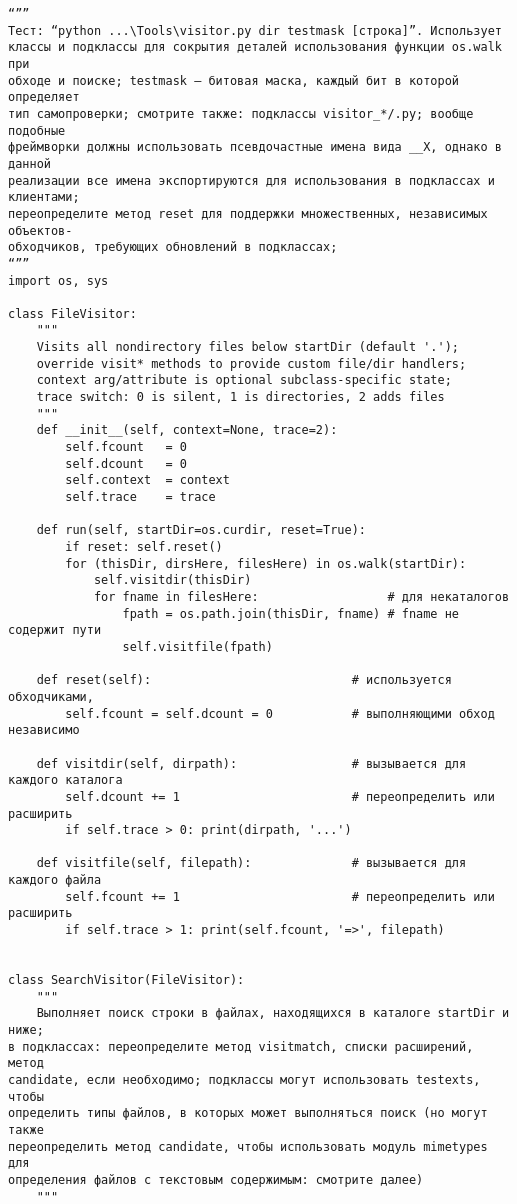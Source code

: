 \documentclass[12pt]{article}
\begin{document}
\begin{verbatim}
“””
Тест: “python ...\Tools\visitor.py dir testmask [строка]”. Использует
классы и подклассы для сокрытия деталей использования функции os.walk при
обходе и поиске; testmask – битовая маска, каждый бит в которой определяет
тип самопроверки; смотрите также: подклассы visitor_*/.py; вообще подобные
фреймворки должны использовать псевдочастные имена вида __X, однако в данной
реализации все имена экспортируются для использования в подклассах и клиентами;
переопределите метод reset для поддержки множественных, независимых объектов-
обходчиков, требующих обновлений в подклассах;
“””
import os, sys

class FileVisitor:
    """
    Visits all nondirectory files below startDir (default '.');
    override visit* methods to provide custom file/dir handlers;
    context arg/attribute is optional subclass-specific state;
    trace switch: 0 is silent, 1 is directories, 2 adds files
    """
    def __init__(self, context=None, trace=2):
        self.fcount   = 0
        self.dcount   = 0
        self.context  = context
        self.trace    = trace

    def run(self, startDir=os.curdir, reset=True):
        if reset: self.reset()
        for (thisDir, dirsHere, filesHere) in os.walk(startDir):
            self.visitdir(thisDir)
            for fname in filesHere:                  # для некаталогов
                fpath = os.path.join(thisDir, fname) # fname не содержит пути
                self.visitfile(fpath)
 
    def reset(self):                            # используется обходчиками,
        self.fcount = self.dcount = 0           # выполняющими обход независимо

    def visitdir(self, dirpath):                # вызывается для каждого каталога
        self.dcount += 1                        # переопределить или расширить
        if self.trace > 0: print(dirpath, '...')

    def visitfile(self, filepath):              # вызывается для каждого файла
        self.fcount += 1                        # переопределить или расширить
        if self.trace > 1: print(self.fcount, '=>', filepath)


class SearchVisitor(FileVisitor):
    """
    Выполняет поиск строки в файлах, находящихся в каталоге startDir и ниже;
в подклассах: переопределите метод visitmatch, списки расширений, метод
candidate, если необходимо; подклассы могут использовать testexts, чтобы
определить типы файлов, в которых может выполняться поиск (но могут также
переопределить метод candidate, чтобы использовать модуль mimetypes для
определения файлов с текстовым содержимым: смотрите далее)
    """


\end{verbatim}
\end{document}
